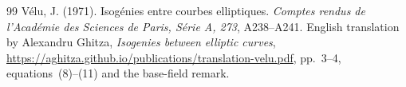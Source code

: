 \documentclass[11pt]{article}
\theoremstyle{definition}
\theoremstyle{remark}
\begin{document}
\begin{thebibliography}{99}
V\'elu, J. (1971).
Isog\'enies entre courbes elliptiques.
\emph{Comptes rendus de l'Acad\'emie des Sciences de Paris,
S\'erie A, 273}, A238--A241.
English translation by Alexandru Ghitza,
\emph{Isogenies between elliptic curves},
\url{https://aghitza.github.io/publications/translation-velu.pdf},
pp.~3--4, equations~(8)--(11) and the base-field remark.

\end{thebibliography}
\end{document}
